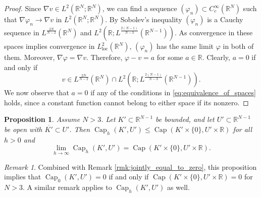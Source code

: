 \documentclass{article}
\numberwithin{equation}{section}
\newtheorem{proposition}[theorem]{Proposition}
\theoremstyle{definition}
\theoremstyle{remark}
\newtheorem{remark}{Remark}[theorem]
\newcommand{\cpct}{\operatorname{Cap}}
\begin{document}
\begin{proof}
    Since $\nabla v \in L^2(\mathbb{R}^N; \mathbb{R}^N)$, we can find a sequence $(\varphi_n) \subset C_c^\infty(\mathbb{R}^N)$ such that $\nabla \varphi_n \to \nabla v$ in $L^2(\mathbb{R}^N; \mathbb{R}^N)$. By Sobolev's inequality $(\varphi_n)$ is a Cauchy sequence in $L^\frac{2N}{N - 2}(\mathbb{R}^N)$ and $L^2(\mathbb{R}; L^\frac{2(N - 1)}{N - 3}(\mathbb{R}^{N - 1}))$. As convergence in these spaces implies convergence in $L_\mathrm{loc}^2(\mathbb{R}^N)$, $(\varphi_n)$ has the same limit $\varphi$ in both of them. Moreover, $\nabla \varphi = \nabla v$. Therefore, $\varphi - v = a$ for some $a \in \mathbb{R}$. Clearly, $a = 0$ if and only if
    \[
    v \in L^\frac{2N}{N - 2}(\mathbb{R}^N) \cap L^2(\mathbb{R}; L^\frac{2(N - 1)}{N - 3}(\mathbb{R}^{N - 1})).
    \]
    We now observe that $a = 0$ if any of the conditions in \eqref{eq:equivalence_of_spaces} holds, since a constant function cannot belong to either space if its nonzero.
\end{proof}

\begin{proposition} \label{pr:limit_at_infinity}
    Assume $N > 3$. Let $K' \subset \mathbb{R}^{N - 1}$ be bounded, and let $U' \subset \mathbb{R}^{N - 1}$ be open with $\overline{K'} \subset U'$. Then $\cpct_h(K', U') \le \cpct(K' \times \{0\}, U' \times \mathbb{R})$ for all $h > 0$ and
    \[
    \lim_{h \to \infty} \cpct_h(K', U') = \cpct(K' \times \{0\}, U' \times \mathbb{R}).
    \]
\end{proposition}

\begin{remark} \label{rmk:jointly_equal_to_zero_2}
    Combined with Remark \ref{rmk:jointly_equal_to_zero}, this proposition implies that $\cpct_0(K', U') = 0$ if and only if $\cpct(K' \times \{0\}, U' \times \mathbb{R}) = 0$ for $N > 3$. A similar remark applies to $\cpct_h(K', U')$ as well.
\end{remark}
\end{document}
